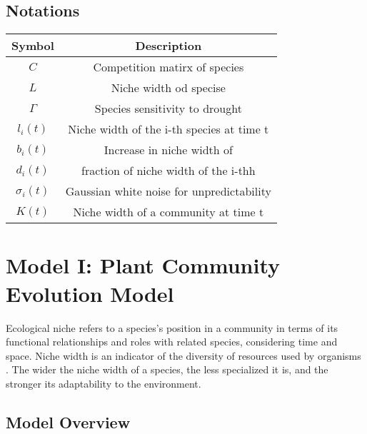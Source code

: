 \documentclass{mcmthesis}
\newcommand{\upcite}[1]{\textsuperscript{\textsuperscript{\cite{#1}}}}
\begin{document}
\subsection{Notations}
\begin{table}[h]%
	\centering%
	\renewcommand\arraystretch{1.5}%
	\tabcolsep=1.5cm%
	\begin{tabular}{@{}cclll@{}}
		\toprule[1.5pt]
		\textbf{Symbol}               & \multicolumn{4}{c}{\textbf{Description}}                      \\
		\midrule[1pt]
		$C$                           & \multicolumn{4}{c}{Competition matirx of species}             \\
		$L$                           & \multicolumn{4}{c}{Niche width od specise}                    \\
		$\Gamma $                     & \multicolumn{4}{c}{Species sensitivity to drought}            \\
		${l_i}\left( t \right)$       & \multicolumn{4}{c}{Niche width of the i-th species at time t} \\
		${b_i}\left( t \right)$       & \multicolumn{4}{c}{Increase in niche width of }               \\
		${d_i}\left( t \right)$       & \multicolumn{4}{c}{fraction of niche width of the i-thh}      \\
		${\sigma _i}\left( t \right)$ & \multicolumn{4}{c}{Gaussian white noise for unpredictability} \\
		$K\left( t \right)$           & \multicolumn{4}{c}{Niche width of a community at time t}      \\
		\bottomrule[1.5pt]
	\end{tabular}
\end{table}
\section{Model I: Plant Community Evolution Model}
Ecological niche refers to a species's position in a community in terms of its functional relationships
and roles with related species, considering time and space. Niche width is an indicator of the
diversity of resources used by organisms \upcite{Mishra2023}. The wider the niche width of a species, the less
specialized it is, and the stronger its adaptability to the environment.
\subsection{Model Overview}
\end{document}
